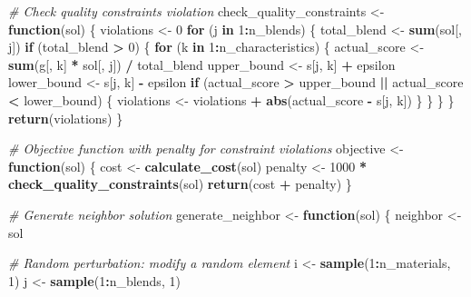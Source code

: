 \documentclass[
]{article}
\newenvironment{Shaded}{\begin{snugshade}}{\end{snugshade}}
\newcommand{\CommentTok}[1]{\textcolor[rgb]{0.56,0.35,0.01}{\textit{#1}}}
\newcommand{\ControlFlowTok}[1]{\textcolor[rgb]{0.13,0.29,0.53}{\textbf{#1}}}
\newcommand{\DecValTok}[1]{\textcolor[rgb]{0.00,0.00,0.81}{#1}}
\newcommand{\FunctionTok}[1]{\textcolor[rgb]{0.13,0.29,0.53}{\textbf{#1}}}
\newcommand{\NormalTok}[1]{#1}
\newcommand{\OtherTok}[1]{\textcolor[rgb]{0.56,0.35,0.01}{#1}}
\newcommand{\SpecialCharTok}[1]{\textcolor[rgb]{0.81,0.36,0.00}{\textbf{#1}}}
\begin{document}
\begin{Shaded}
\begin{Highlighting}[]
  \CommentTok{\# Check quality constraints violation}
\NormalTok{  check\_quality\_constraints }\OtherTok{\textless{}{-}} \ControlFlowTok{function}\NormalTok{(sol) \{}
\NormalTok{    violations }\OtherTok{\textless{}{-}} \DecValTok{0}
    \ControlFlowTok{for}\NormalTok{ (j }\ControlFlowTok{in} \DecValTok{1}\SpecialCharTok{:}\NormalTok{n\_blends) \{}
\NormalTok{      total\_blend }\OtherTok{\textless{}{-}} \FunctionTok{sum}\NormalTok{(sol[, j])}
      \ControlFlowTok{if}\NormalTok{ (total\_blend }\SpecialCharTok{\textgreater{}} \DecValTok{0}\NormalTok{) \{}
        \ControlFlowTok{for}\NormalTok{ (k }\ControlFlowTok{in} \DecValTok{1}\SpecialCharTok{:}\NormalTok{n\_characteristics) \{}
\NormalTok{          actual\_score }\OtherTok{\textless{}{-}} \FunctionTok{sum}\NormalTok{(g[, k] }\SpecialCharTok{*}\NormalTok{ sol[, j]) }\SpecialCharTok{/}\NormalTok{ total\_blend}
\NormalTok{          upper\_bound }\OtherTok{\textless{}{-}}\NormalTok{ s[j, k] }\SpecialCharTok{+}\NormalTok{ epsilon}
\NormalTok{          lower\_bound }\OtherTok{\textless{}{-}}\NormalTok{ s[j, k] }\SpecialCharTok{{-}}\NormalTok{ epsilon}
          \ControlFlowTok{if}\NormalTok{ (actual\_score }\SpecialCharTok{\textgreater{}}\NormalTok{ upper\_bound }\SpecialCharTok{||}\NormalTok{ actual\_score }\SpecialCharTok{\textless{}}\NormalTok{ lower\_bound) \{}
\NormalTok{            violations }\OtherTok{\textless{}{-}}\NormalTok{ violations }\SpecialCharTok{+} \FunctionTok{abs}\NormalTok{(actual\_score }\SpecialCharTok{{-}}\NormalTok{ s[j, k])}
\NormalTok{          \}}
\NormalTok{        \}}
\NormalTok{      \}}
\NormalTok{    \}}
    \FunctionTok{return}\NormalTok{(violations)}
\NormalTok{  \}}
  
  \CommentTok{\# Objective function with penalty for constraint violations}
\NormalTok{  objective }\OtherTok{\textless{}{-}} \ControlFlowTok{function}\NormalTok{(sol) \{}
\NormalTok{    cost }\OtherTok{\textless{}{-}} \FunctionTok{calculate\_cost}\NormalTok{(sol)}
\NormalTok{    penalty }\OtherTok{\textless{}{-}} \DecValTok{1000} \SpecialCharTok{*} \FunctionTok{check\_quality\_constraints}\NormalTok{(sol)}
    \FunctionTok{return}\NormalTok{(cost }\SpecialCharTok{+}\NormalTok{ penalty)}
\NormalTok{  \}}
  
  \CommentTok{\# Generate neighbor solution}
\NormalTok{  generate\_neighbor }\OtherTok{\textless{}{-}} \ControlFlowTok{function}\NormalTok{(sol) \{}
\NormalTok{    neighbor }\OtherTok{\textless{}{-}}\NormalTok{ sol}
    
    \CommentTok{\# Random perturbation: modify a random element}
\NormalTok{    i }\OtherTok{\textless{}{-}} \FunctionTok{sample}\NormalTok{(}\DecValTok{1}\SpecialCharTok{:}\NormalTok{n\_materials, }\DecValTok{1}\NormalTok{)}
\NormalTok{    j }\OtherTok{\textless{}{-}} \FunctionTok{sample}\NormalTok{(}\DecValTok{1}\SpecialCharTok{:}\NormalTok{n\_blends, }\DecValTok{1}\NormalTok{)}
    

\end{Highlighting}
\end{Shaded}
\end{document}
